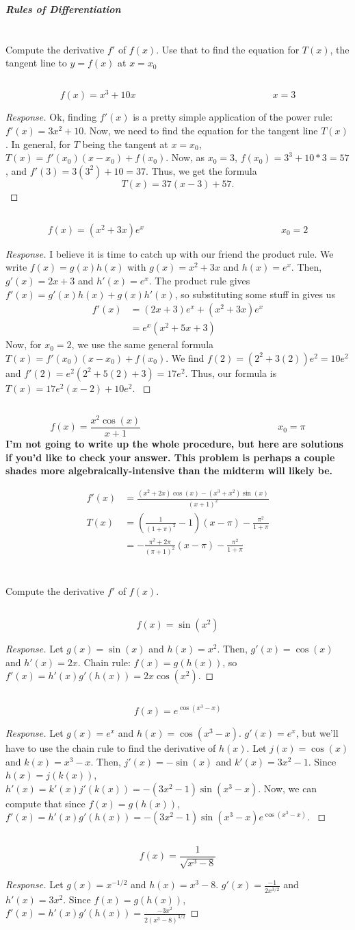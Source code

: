 \documentclass[english]{article}
\newcommand{\prob}[1]{\setcounter{section}{#1-1}\section{}}
\newcommand{\prt}[1]{\setcounter{subsection}{#1-1}\subsection{}}
\theoremstyle{remark}
\theoremstyle{definition}
\newcommand{\resp}[1]{\begin{proof}[Response]{#1}\end{proof}}
\begin{document}
		\begin{center}{\LARGE\textbf{\emph{Rules of Differentiation}}}\end{center}
\prob{7} Compute the derivative $f'$ of $f(x)$. Use that to find the equation for $T(x)$, the tangent line to $y=f(x)$ at $x=x_0$
\prt{1} $$f(x)=x^3+10x\hspace{6cm} x=3$$\resp{Ok, finding $f'(x)$ is a pretty simple application of the power rule: $f'(x)=3x^2+10$. Now, we need to find the equation for the tangent line $T(x)$. In general, for $T$ being the tangent at $x=x_0$, $T(x)=f'(x_0)(x-x_0)+f(x_0)$. Now, as $x_0=3$, $f(x_0)=3^3+10*3=57$, and $f'(3)=3(3^2)+10=37$. Thus, we get the formula $$T(x)=37(x-3)+57.$$}
\prt{2} $$f(x)=(x^2+3x)e^x\hspace{6cm}x_0=2$$\resp{
I believe it is time to catch up with our friend the product rule. We write $f(x)=g(x)h(x)$ with $g(x)=x^2+3x$ and $h(x)=e^x$. Then, $g'(x)=2x+3$ and $h'(x)=e^x$. The product rule gives $f'(x)=g'(x)h(x)+g(x)h'(x)$, so substituting some stuff in gives us \begin{align*}f'(x)&=(2x+3)e^x+(x^2+3x)e^x\\&=e^x(x^2+5x+3)
\end{align*} 
Now, for $x_0=2$, we use the same general formula  $T(x)=f'(x_0)(x-x_0)+f(x_0)$. We find $f(2)=(2^2+3(2))e^2=10e^2$ and $f'(2)=e^2(2^2+5(2)+3)=17e^2$. Thus, our formula is $T(x)=17e^2(x-2)+10e^2$.
}
\prt{3} $$f(x)=\frac{x^2\cos(x)}{x+1}\hspace{6cm}x_0=\pi$$
\textbf{I'm not going to write up the whole procedure, but here are solutions if you'd like to check your answer. This problem is perhaps a couple shades more algebraically-intensive than the midterm will likely be.}

\begin{align}
	f'(x)&=\frac{(x^2+2x) \cos (x)- (x^3+x^2) \sin (x)}{(x+1)^2}\\
	T(x)&=\left(\frac{1}{(1+\pi )^2}-1\right)(x-\pi)-\frac{\pi^2}{1+\pi}\\
	&=-\frac{\pi^2+2\pi}{(\pi+1)^2}(x-\pi)-\frac{\pi^2}{1+\pi}\end{align}

\prob{8} Compute the derivative $f'$ of $f(x)$. 
\prt{1}$$f(x)=\sin(x^2)$$
\resp{Let $g(x)=\sin(x)$ and $h(x)=x^2$. Then, $g'(x)=\cos(x)$ and $h'(x)=2x$. Chain rule: $f(x)=g(h(x))$, so $f'(x)=h'(x)g'(h(x))=2x\cos(x^2)$.}
\prt{2} $$f(x)=e^{\cos(x^3-x)}$$
\resp{
Let $g(x)=e^x$ and $h(x)=\cos(x^3-x)$. $g'(x)=e^x$, but we'll have to use the chain rule to find the derivative of $h(x)$. Let $j(x)=\cos(x)$ and $k(x)=x^3-x$. Then, $j'(x)=-\sin(x)$ and $k'(x)=3x^2-1$. Since $h(x)=j(k(x))$, $h'(x)=k'(x)j'(k(x))=-(3x^2-1)\sin(x^3-x)$. Now, we can compute that since $f(x)=g(h(x))$, $f'(x)=h'(x)g'(h(x))=-(3x^2-1)\sin(x^3-x)e^{\cos(x^3-x)}$.
}
\prt{3} $$f(x)=\frac{1}{\sqrt{x^3-8}}$$
\resp{Let $g(x)=x^{-1/2}$ and $h(x)=x^3-8$. $g'(x)=\frac{-1}{2x^{3/2}}$ and $h'(x)=3x^2$. Since $f(x)=g(h(x))$, $f'(x)=h'(x)g'(h(x))=\frac{-3x^2}{2({x^3-8})^{3/2}}$}
\end{document}
